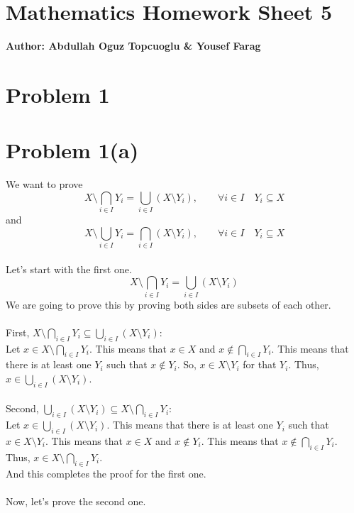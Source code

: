 \documentclass{article}
\begin{document}
\section*{\huge Mathematics Homework Sheet 5}
\begin{flushright}
   \textbf{Author: Abdullah Oguz Topcuoglu \& Yousef Farag}
\end{flushright}

\section*{Problem 1}

\section*{Problem 1(a)}
We want to prove
\[
   X \setminus \bigcap_{i \in I} Y_i = \bigcup_{i \in I} (X \setminus Y_i), \qquad \forall i \in I \quad Y_i \subseteq X
\]
and
\[
   X \setminus \bigcup_{i \in I} Y_i = \bigcap_{i \in I} (X \setminus Y_i), \qquad \forall i \in I \quad Y_i \subseteq X
\]
\\
Let's start with the first one. \\
\[
   X \setminus \bigcap_{i \in I} Y_i = \bigcup_{i \in I} (X \setminus Y_i)
\]
We are going to prove this by proving both sides are subsets of each other.\\
\\
First, \(X \setminus \bigcap_{i \in I} Y_i \subseteq \bigcup_{i \in I} (X \setminus Y_i)\): \\
Let \(x \in X \setminus \bigcap_{i \in I} Y_i\). This means that \(x \in X\) and \(x \notin \bigcap_{i \in I} Y_i\). This means that there is at least one \(Y_i\) such that \(x \notin Y_i\). So, \(x \in X \setminus Y_i\) for that \(Y_i\). Thus, \(x \in \bigcup_{i \in I} (X \setminus Y_i)\).\\
\\
Second, \(\bigcup_{i \in I} (X \setminus Y_i) \subseteq X \setminus \bigcap_{i \in I} Y_i\): \\
Let \(x \in \bigcup_{i \in I} (X \setminus Y_i)\). This means that there is at least one \(Y_i\) such that \(x \in X \setminus Y_i\). This means that \(x \in X\) and \(x \notin Y_i\). This means that \(x \notin \bigcap_{i \in I} Y_i\). Thus, \(x \in X \setminus \bigcap_{i \in I} Y_i\).\\
And this completes the proof for the first one.\\
\\
Now, let's prove the second one.\\
\end{document}
